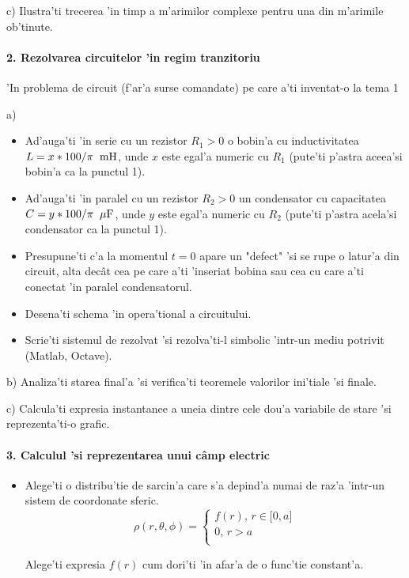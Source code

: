\documentclass[titlepage, a4paper,12pt]{article}
\newcommand\spatiu[1][0.2cm]{\hspace*{#1}} %
\begin{document}
c) Ilustra'ti trecerea 'in timp a m'arimilor complexe pentru una din m'arimile ob'tinute.

\paragraph{2. Rezolvarea circuitelor 'in regim tranzitoriu} \mbox{}

'In problema de circuit (f'ar'a surse comandate) pe care a'ti inventat-o la tema 1

a) \begin{itemize}
  \item Ad'auga'ti 'in serie cu un rezistor $R_1>0$ o bobin'a cu inductivitatea $L=x*100/\pi\spatiu\mathrm{mH}$, unde $x$ este egal'a numeric cu $R_1$ (pute'ti p'astra aceea'si bobin'a ca la punctul 1).
  \item Ad'auga'ti 'in paralel cu un rezistor $R_2>0$ un condensator cu capacitatea $C=y*100/\pi \spatiu\mu\mathrm{F}$, unde $y$ este egal'a numeric cu $R_2$ (pute'ti p'astra acela'si condensator ca la punctul 1).
  \item Presupune'ti c'a la momentul $t=0$ apare un "defect" 'si se rupe o latur'a din circuit, alta dec\^at cea pe care a'ti 'inseriat bobina sau cea cu care a'ti conectat 'in paralel condensatorul.
  \item Desena'ti schema 'in opera'tional a circuitului.
  \item Scrie'ti sistemul de rezolvat 'si rezolva'ti-l simbolic 'intr-un mediu potrivit (Matlab, Octave).
\end{itemize}

b) Analiza'ti starea final'a 'si verifica'ti teoremele valorilor ini'tiale 'si finale. \\ \par

c) Calcula'ti expresia instantanee a uneia dintre cele dou'a variabile de stare 'si reprezenta'ti-o grafic.

\paragraph{3. Calculul 'si reprezentarea unui c\^amp electric} \mbox{}

\begin{itemize}
  \item Alege'ti o distribu'tie de sarcin'a care s'a depind'a numai de raz'a 'intr-un sistem de coordonate sferic.
    \[   
\rho(r, \theta, \phi) = 
     \begin{cases}
       \text{$f(r)$, $r \in \big[0,a\big]$} \\
       \text{0, $r>a$} \\
     \end{cases}
\]

Alege'ti expresia $f(r)$ cum dori'ti 'in afar'a de o func'tie constant'a.

\end{itemize}
\end{document}
